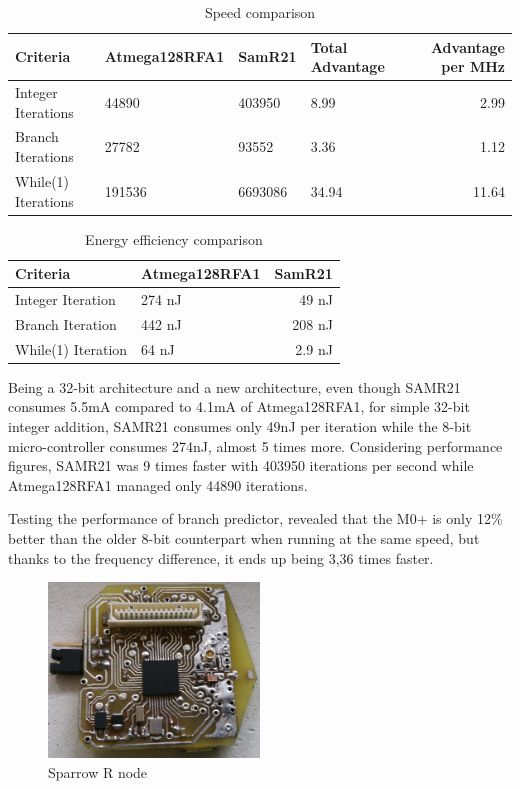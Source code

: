 \begin{table} \centering
\begin{tabular}{llllr}
\hline
Criteria    & Atmega128RFA1 & SamR21 & Total Advantage & Advantage per MHz \\
\hline
Integer Iterations      & 44890    & 403950   & 8.99 &  2.99 \\
Branch Iterations      & 27782    & 93552  &  3.36 &  1.12  \\
While(1) Iterations          & 191536     & 6693086    & 34.94  & 11.64  \\
\hline
\hline
\end{tabular}
\caption{Speed comparison}
\end{table}

\begin{table} \centering
\begin{tabular}{llr}
\hline
Criteria    & Atmega128RFA1 & SamR21 \\
\hline
Integer Iteration    &  274 nJ & 49 nJ \\
Branch Iteration      & 442 nJ & 208 nJ  \\
While(1) Iteration          & 64 nJ & 2.9 nJ \\
\hline
\hline
\end{tabular}
\caption{Energy efficiency comparison}
\end{table}

Being a 32-bit architecture and a new architecture, even though SAMR21 consumes 5.5mA
compared to 4.1mA of Atmega128RFA1, for simple 32-bit integer addition, SAMR21 consumes only 49nJ
per iteration while the 8-bit micro-controller consumes 274nJ, almost 5 times more. Considering
performance figures, SAMR21 was 9 times faster with 403950 iterations per second while
Atmega128RFA1 managed only 44890 iterations.

Testing the performance of branch predictor, revealed that the M0+ is only 12\% better than
the older 8-bit counterpart when running at the same speed, but thanks to the frequency difference, it ends up being 3,36 times
faster.


\begin{figure}[ht] \centering
\includegraphics[width=0.5\textwidth]{img/sparrowrf.jpg}
\caption{Sparrow R node}
\end{figure}

